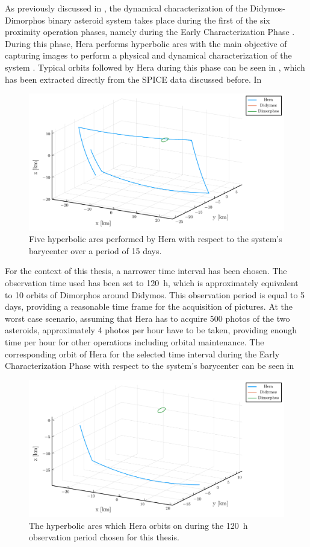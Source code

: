 As previously discussed in , the dynamical characterization of the Didymos-Dimorphos binary asteroid system takes place during the first of the six proximity operation phases, namely during the Early Characterization Phase \cite{hera-autonomous-ops}. During this phase, Hera performs hyperbolic arcs with the main objective of capturing images to perform a physical and dynamical characterization of the system \cite{hera-autonomous-ops}. Typical orbits followed by Hera during this phase can be seen in , which has been extracted directly from the SPICE data discussed before. In 

\begin{figure}[h]
	\centering
	\includegraphics[width=\textwidth]{Figures/Chapter2/ECP_extended_reference_plot.pdf}
	\caption{Five hyperbolic arcs performed by Hera with respect to the system's barycenter over a period of 15 days.}
	\label{fig:hera_extended_orbit}
\end{figure}

For the context of this thesis, a narrower time interval has been chosen. The observation time used has been set to \si{120 \hour}, which is approximately equivalent to 10 orbits of Dimorphos around Didymos. This observation period is equal to \num{5} days, providing a reasonable time frame for the acquisition of pictures. At the worst case scenario, assuming that Hera has to acquire \num{500} photos of the two asteroids, approximately \num{4} photos per hour have to be taken, providing enough time per hour for other operations including orbital maintenance. The corresponding orbit of Hera for the selected time interval during the Early Characterization Phase with respect to the system's barycenter can be seen in 


\begin{figure}[h]
	\centering
	\includegraphics[width=\textwidth]{Figures/Chapter2/ECP_thesis_orbit_plot.pdf}
	\caption{The hyperbolic arcs which Hera orbits on during the \si{120\hour} observation period chosen for this thesis.}
	\label{fig:hera_thesis_orbit}
\end{figure}